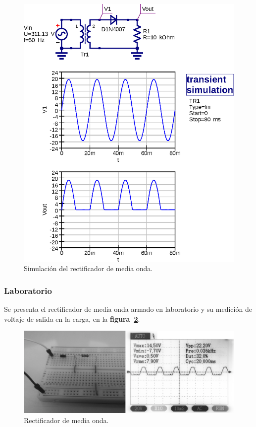 \begin{figure}[!h]
\centering
\includegraphics[scale=0.75]{simulacion/02.media_onda1.eps}
\caption{Simulación del rectificador de media onda.}
\label{simulacion02}
\end{figure}

\subsubsection{Laboratorio}
Se presenta el rectificador de media onda armado en laboratorio y su medición
de voltaje de salida en la carga, en la \textbf{figura~\ref{laboratorio04}}.

\begin{figure}[!h]
\centering
\includegraphics[scale=0.34]{fotos/02.media_onda1.eps}
\caption{Rectificador de media onda.}
\label{laboratorio04}
\end{figure}

